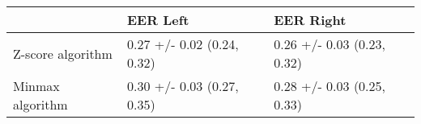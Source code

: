 \begin{tabular}{lll}
\toprule
{} &                    EER Left &                   EER Right \\
\midrule
Z-score algorithm &  0.27 +/- 0.02 (0.24, 0.32) &  0.26 +/- 0.03 (0.23, 0.32) \\
Minmax algorithm  &  0.30 +/- 0.03 (0.27, 0.35) &  0.28 +/- 0.03 (0.25, 0.33) \\
\bottomrule
\end{tabular}
